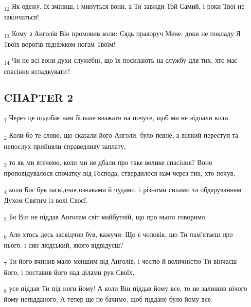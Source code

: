 \begin{tcolorbox}
\textsubscript{12} Як одежу, їх зміниш, і минуться вони, а Ти завжди Той Самий, і роки Твої не закінчаться!
\end{tcolorbox}
\begin{tcolorbox}
\textsubscript{13} Кому з Анголів Він промовив коли: Сядь праворуч Мене, доки не покладу Я Твоїх ворогів підніжком ногам Твоїм!
\end{tcolorbox}
\begin{tcolorbox}
\textsubscript{14} Чи не всі вони духи служебні, що їх посилають на службу для тих, хто має спасіння вспадкувати?
\end{tcolorbox}
\subsection{CHAPTER 2}
\begin{tcolorbox}
\textsubscript{1} Через це подобає нам більше вважати на почуте, щоб ми не відпали коли.
\end{tcolorbox}
\begin{tcolorbox}
\textsubscript{2} Коли бо те слово, що сказали його Анголи, було певне, а всякий переступ та непослух прийняли справедливу заплату,
\end{tcolorbox}
\begin{tcolorbox}
\textsubscript{3} то як ми втечемо, коли ми не дбали про таке велике спасіння? Воно проповідувалося спочатку від Господа, ствердилося нам через тих, хто почув,
\end{tcolorbox}
\begin{tcolorbox}
\textsubscript{4} коли Бог був засвідчив ознаками й чудами, і різними силами та обдаруванням Духом Святим із волі Своєї.
\end{tcolorbox}
\begin{tcolorbox}
\textsubscript{5} Бо Він не піддав Анголам світ майбутній, що про нього говоримо.
\end{tcolorbox}
\begin{tcolorbox}
\textsubscript{6} Але хтось десь засвідчив був, кажучи: Що є чоловік, що Ти пам'ятаєш про нього, і син людський, якого відвідуєш?
\end{tcolorbox}
\begin{tcolorbox}
\textsubscript{7} Ти його вчинив мало меншим від Анголів, і честю й величністю Ти вінчаєш його, і поставив його над ділами рук Своїх,
\end{tcolorbox}
\begin{tcolorbox}
\textsubscript{8} усе піддав Ти під ноги йому! А коли Він піддав йому все, то не залишив нічого йому непідданого. А тепер ще не бачимо, щоб піддане було йому все.
\end{tcolorbox}
